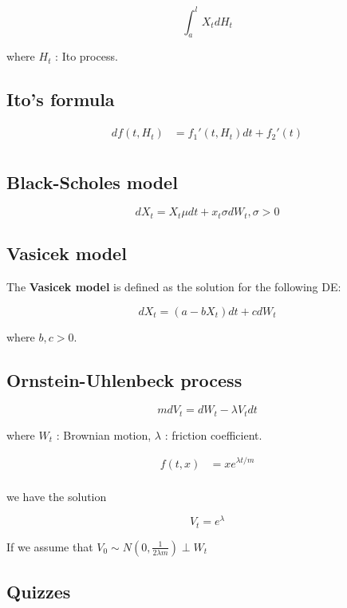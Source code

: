 \documentclass[12pt]{article}
\theoremstyle{nonumberbreak}
\begin{document}
$$
\int_a^l X_t dH_t
$$

where $H_t$ : Ito process. 



\subsection{Ito's formula}



$$
\begin{aligned}
df(t,H_t) &= f_1'(t,H_t)dt + f_2'(t) \\[8pt]
\end{aligned}
$$


\subsection{Black-Scholes model}

$$
dX_t = X_t \mu dt + x_t \sigma dW_t, \sigma >0
$$




\subsection{Vasicek model}

The \textbf{Vasicek model} is defined as the solution for the following DE:

$$
dX_t = (a - b X_t) dt + c dW_t
$$

where $b,c > 0$. 




\subsection{Ornstein-Uhlenbeck process}


$$
m dV_t = dW_t - \lambda V_t dt
$$

where $W_t$ : Brownian motion, $\lambda$ : friction coefficient. 


$$
\begin{aligned}
f(t,x) &= x e^{\lambda t/m} \\[8pt]
\end{aligned}
$$

we have the solution 


$$
V_t = e^{\lambda}
$$

If we assume that $V_0 \sim N \left( 0, \frac{1}{2\lambda m} \right) \perp W_t$






\subsection*{Quizzes}
\end{document}
